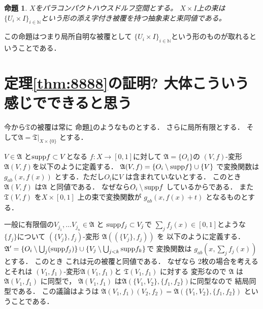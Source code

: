 \documentclass[leqno]{jsarticle}
\newtheorem{prop}[thm]{命題}
\newcommand{\nn}{\mathbb{N}}
\newcommand{\supp}{\text{{\rm supp}}}
\begin{document}
\begin{prop}\label{prop:9}
$X$をパラコンパクトハウスドルフ空間とする。
$X\times I$上の束は$\{U_i\times I\}_{i\in\nn}$という形の添え字付き被覆を持つ抽象束と束同値である。
\end{prop}
この命題はつまり局所自明な被覆として
$\{U_i\times I\}_{i\in\nn}$という形のものが取れるということである．


\section{定理\ref{thm:8888}の証明? 大体こういう感じでできると思う}
今から$\mathfrak{T}$の被覆は常に
命題\ref{prop:9}のようなものとする．
さらに局所有限とする．
そして$\mathfrak{A}=\mathfrak{T}|_{X\times \{0\}}$
とする．

$V\in \mathfrak{A}$
と$\supp f\subset V$となる
$f\colon X\to [0, 1]$に対して
$\mathfrak{A}=\{O_{i}\}$の
$(V, f)$-変形
$\mathfrak{A}(V, f)$を以下のように定義する．
$\mathfrak{A}(V, f)=\{O_{i}\setminus \supp f\}\cup 
\{V\}$
で変換関数は$g_{ab}(x, f(x))$
とする．ただし$O_{i}$に$V$
は含まれていないとする．
このとき$\mathfrak{A}(V, f)$
は$\mathfrak{A}$
と同値である．
なぜなら$O_{i}\setminus \supp f$
しているからである．
また$\mathfrak{T}(V, f)$
を$X\times [0, 1]$
上の束で変換関数が
$g_{ab}(x, f(x)+t)$
となるものとする．


一般に有限個の$V_{j_{1}}, \dots V_{j_{n}}\in \mathfrak{A}$
と
$\supp f_{j}\subset V_{j}$で
$\sum_{j}f_{j}(x)\in [0, 1]$とような
$\{f_{j}\}$について
$(\{V_{j}\}, f_{j})$-変形
$\mathfrak{A}((\{V_{j}\}, f_{j}))$
を
以下のように定義する．
$\mathfrak{A}^{\prime}=\{O_{i}\setminus \bigcup_{j} (\supp f_{j})\}\cup \{V_{j}\setminus 
\bigcup_{j<k}\supp f_{k}\}$で
変換関数は
$g_{ab}\left(x, \sum_{j}f_{j}(x)\right)$
とする．
このとき
これは元の被覆と同値である．
なぜなら
2枚の場合を考えるとそれは
$(V_{1}, f_{1})$-変形$\mathfrak{A}(V_{1}, f_{1})$と
$\mathfrak{T}(V_{1}, f_{1})$
に対する
変形なので
$\mathfrak{A}$
は$\mathfrak{A}(V_{1}, f_{1})$
に同型で，
$\mathfrak{A}(V_{1}, f_{1})$
は$\mathfrak{A}(\{V_{1}, V_{2}\}, \{f_{1}, f_{2}\})$に同型なので
結局同型である．
この議論はようは
$\mathfrak{A}(V_{1}, f_{1})(V_{2}, f_{2})
=\mathfrak{A}(\{V_{1}, V_{2}\}, \{f_{1}, f_{2}\})$
ということである．
\end{document}
